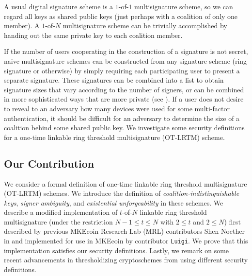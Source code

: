 \documentclass{mrl}
\theoremstyle{definition}
\begin{document}
A usual digital signature scheme is a $1$-of-$1$ multisignature scheme, so we can regard all keys as shared public keys (just perhaps with a coalition of only one member). A $1$-of-$N$ multisignature scheme can be trivially accomplished by handing out the same private key to each coalition member. 

If the number of users cooperating in the construction of a signature is not secret, naive multisignature schemes can be constructed from any signature scheme (ring signature or otherwise) by simply requiring each participating user to present a separate signature. These signatures can be combined into a list to obtain signature sizes that vary according to the number of signers, or can be combined in more sophisticated ways that are more private (see \cite{bonehthreshold}).  If a user does not desire to reveal to an adversary how many devices were used for some multi-factor authentication, it should be difficult for an adversary to determine the size of a coalition behind some shared public key. We investigate some security definitions for a one-time linkable ring threshold multisignature (OT-LRTM) scheme.





\subsection{Our Contribution}


We consider a formal definition of one-time linkable ring threshold multisignature (OT-LRTM) schemes. We introduce the definition of \textit{coalition-indistinguishable keys}, \textit{signer ambiguity}, and \textit{existential unforgeability} in these schemes. We describe a modified implementation of $t$-of-$N$ linkable ring threshold multisignature (under the restriction $N-1 \leq t \leq N$ with $2 
\leq t$ and $2 \leq N$) first described by previous MKEcoin Research Lab (MRL) contributors Shen Noether in \cite{noether2016ring} and implemented for use in MKEcoin by contributor \texttt{Luigi}. We prove that this implementation satisfies our security definitions. Lastly, we remark on some recent advancements in thresholdizing cryptoschemes from \cite{bonehthreshold} using different security definitions.
\end{document}
